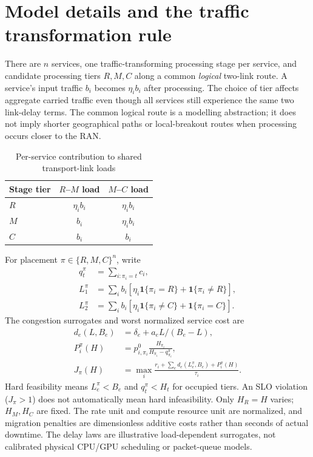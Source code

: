 \documentclass[10pt,a4paper]{article}
\begin{document}
\section{Model details and the traffic transformation rule}
There are $n$ services, one traffic-transforming processing stage per service, and candidate processing tiers $R,M,C$ along a common \emph{logical} two-link route. A service's input traffic $b_i$ becomes $\eta_i b_i$ after processing. The choice of tier affects aggregate carried traffic even though all services still experience the same two link-delay terms. The common logical route is a modelling abstraction; it does not imply shorter geographical paths or local-breakout routes when processing occurs closer to the RAN.
\begin{table}[h]\centering
\caption{Per-service contribution to shared transport-link loads}\label{tab:traffic}
\begin{tabular}{lcc}\toprule Stage tier & $R$--$M$ load & $M$--$C$ load\\\midrule
$R$ & $\eta_i b_i$ & $\eta_i b_i$\\
$M$ & $b_i$ & $\eta_i b_i$\\
$C$ & $b_i$ & $b_i$\\\bottomrule
\end{tabular}\end{table}
For placement $\pi\in\{R,M,C\}^n$, write
\begin{align*}
q_t^\pi&=\sum_{i:\pi_i=t}c_i,\\
L_1^\pi&=\sum_i b_i[\eta_i\mathbf 1\{\pi_i=R\}+\mathbf 1\{\pi_i\ne R\}],\\
L_2^\pi&=\sum_i b_i[\eta_i\mathbf 1\{\pi_i\ne C\}+\mathbf 1\{\pi_i=C\}].
\end{align*}
The congestion surrogates and worst normalized service cost are
\begin{align*}
d_e(L,B_e)&=\delta_e+a_e L/(B_e-L),\\
P_i^\pi(H)&=p^0_{i,\pi_i}\frac{H_{\pi_i}}{H_{\pi_i}-q_{\pi_i}^\pi},\\
J_\pi(H)&=\max_i\frac{r_i+\sum_e d_e(L_e^\pi,B_e)+P_i^\pi(H)}{\tau_i}.
\end{align*}
Hard feasibility means $L_e^\pi<B_e$ and $q_t^\pi<H_t$ for occupied tiers. An SLO violation ($J_\pi>1$) does not automatically mean hard infeasibility. Only $H_R=H$ varies; $H_M,H_C$ are fixed. The rate unit and compute resource unit are normalized, and migration penalties are dimensionless additive costs rather than seconds of actual downtime. The delay laws are illustrative load-dependent surrogates, not calibrated physical CPU/GPU scheduling or packet-queue models.
\end{document}
